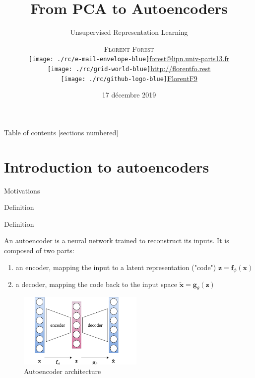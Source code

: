 \documentclass{beamer}
\title{From PCA to Autoencoders}
\subtitle{Unsupervised Representation Learning}
\date{17 décembre 2019}
\author{\textsc{Florent Forest}\vspace{0.2cm}\\
\texttt{[image: ./rc/e-mail-envelope-blue]}\;\scriptsize{\href{mailto:forest@lipn.univ-paris13.fr}{forest@lipn.univ-paris13.fr}}\\
\texttt{[image: ./rc/grid-world-blue]}\;\scriptsize{\href{http://florentfo.rest}{http://florentfo.rest}}\\
\texttt{[image: ./rc/github-logo-blue]}\;\scriptsize{\href{https://github.com/FlorentF9}{FlorentF9}}\\
}
\institute{\vfill\hfill
\texttt{[image: ./rc/logo\_supaero]}}
\begin{document}
  \maketitle

  \begin{frame}{Table of contents}
    [sections numbered]
      \tableofcontents%
  \end{frame}

  \section{Introduction to autoencoders}

  \begin{frame}{Motivations}

    \cite{Hinton2006}
    
  \end{frame}

  \begin{frame}{Definition}


    \begin{exampleblock}{Definition}
      \small{
      An \alert{autoencoder} is a neural network trained to reconstruct its inputs. It is composed of two parts:
      \vspace{-0.4cm}
      \begin{enumerate}
        \item an \alert{encoder}, mapping the input to a latent representation ("code") $\mathbf{z} = \mathbf{f}_{\phi}(\mathbf{x})$
        \item a \alert{decoder}, mapping the code back to the input space $\tilde{\mathbf{x}} = \mathbf{g}_{\theta}(\mathbf{z})$
      \end{enumerate}
      }
    \end{exampleblock}

    \begin{figure}
      \includegraphics[width=6cm]{rc/autoencoder}
      \caption{Autoencoder architecture}\label{fig:autoencoder}
    \end{figure}

  \end{frame}
\end{document}
